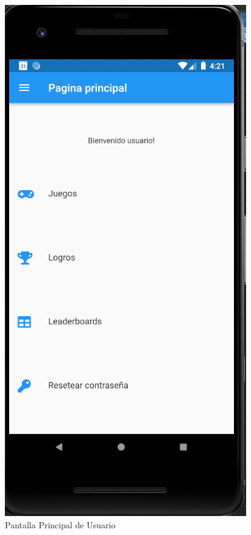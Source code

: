 \documentclass{article}
\begin{document}
\begin{figure}[H]
    \centering
    \includegraphics[scale=0.8]{imgs/Imp/MainUsuario}
    \caption{Pantalla Principal de Usuario}
\end{figure}
\end{document}
